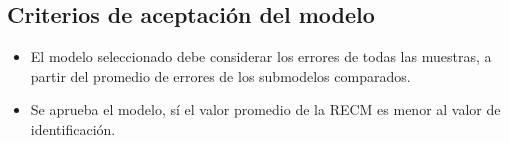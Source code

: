 \subsection{Criterios de aceptaci\'on del modelo}
\begin{itemize}
	\item El modelo seleccionado debe considerar los errores de todas las muestras, a partir del promedio de errores de los submodelos comparados.
	\item Se aprueba el modelo, s\'i el valor promedio de la RECM es menor al valor de  identificaci\'on.
\end{itemize}